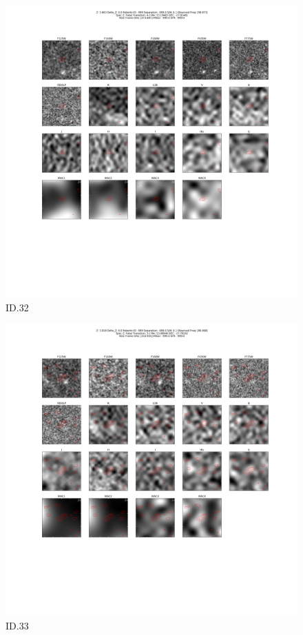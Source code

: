 \begin{figure}[tbp]
\centering \includegraphics[width=120mm]{Matched/ASPECS_Cutout_32.png}
\caption{ID.32}
\label{fig:Match_Three}
\end{figure}

\begin{figure}[tbp]
\centering \includegraphics[width=120mm]{Matched/ASPECS_Cutout_33.png}
\caption{ID.33}
\label{fig:Match_Three}
\end{figure}

